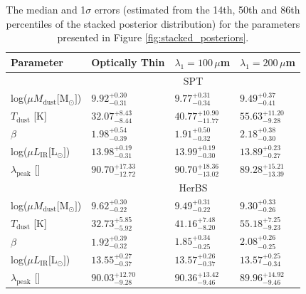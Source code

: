 \begin{table}
    \centering
    \begin{tabular}{p{3.5cm}p{2.5cm}p{2.5cm}p{2.5cm}}
	\hline
	\hline
	Parameter & Optically Thin & $\lambda_1 = 100\,\mu$m & $\lambda_1 = 200\,\mu$m \\
	\hline
	\hline
	& \multicolumn{3}{c}{SPT} \\
	\hline
	log($\mu M_{\textrm{dust}} [$M$_\odot]$) & $9.92_{-0.31}^{+0.30}$ & $9.77_{-0.34}^{+0.31}$ & $9.49_{-0.41}^{+0.37}$ \\
	$T_{\textrm{dust}}$ [K] & $32.07_{-8.44}^{+8.43}$ & $40.77_{-11.77}^{+10.90}$ & $55.63_{-9.28}^{+11.20}$ \\
	$\beta$ & $1.98_{-0.39}^{+0.54}$ & $1.91_{-0.32}^{+0.50}$ & $2.18_{-0.30}^{+0.38}$ \\
	log($\mu L_{\textrm{IR}} [$L$_\odot]$) & $13.98_{-0.31}^{+0.19}$ & $13.99_{-0.30}^{+0.19}$ & $13.89_{-0.27}^{+0.23}$ \\
	$\lambda_{\textrm{peak}}$ [\micron] & $90.70_{-12.72}^{+17.33}$ & $90.70_{-13.02}^{+18.36}$ & $89.28_{-13.39}^{+15.21}$ \\
	
	\hline
	& \multicolumn{3}{c}{HerBS} \\
	\hline
	
	log($\mu M_{\textrm{dust}} [$M$_\odot]$) & $9.62_{-0.22}^{+0.30}$ & $9.49_{-0.22}^{+0.31}$ & $9.30_{-0.26}^{+0.33}$ \\
	$T_{\textrm{dust}}$ [K] & $32.73_{-5.92}^{+5.85}$ & $41.16_{-8.20}^{+7.48}$ & $55.18_{-9.23}^{+7.25}$ \\
	$\beta$ & $1.92_{-0.32}^{+0.39}$ & $1.85_{-0.25}^{+0.34}$ & $2.08_{-0.25}^{+0.26}$ \\
	log($\mu L_{\textrm{IR}} [$L$_\odot]$) & $13.55_{-0.37}^{+0.27}$ & $13.57_{-0.37}^{+0.26}$ & $13.57_{-0.34}^{+0.25}$ \\
	$\lambda_{\textrm{peak}}$ [\micron] & $90.03_{-9.28}^{+12.70}$ & $90.36_{-9.46}^{+13.42}$ & $89.96_{-9.46}^{+14.92}$ \\
	\hline
    \end{tabular}
	\caption[Median values of far-IR to mm SED parameters]{The median and 1$\sigma$ errors (estimated from the 14th, 50th and 86th percentiles of the stacked posterior distribution) for the parameters presented in Figure \ref{fig:stacked_posteriors}.}
    \label{tab:parameter_results}
\end{table}

